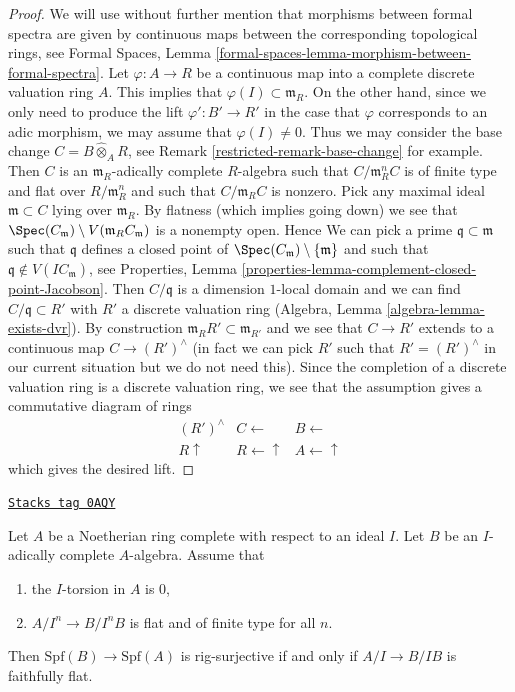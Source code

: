 \begin{proof}

We will use without further mention that morphisms between formal spectra
are given by continuous maps between the corresponding topological rings, see
Formal Spaces, Lemma \ref{formal-spaces-lemma-morphism-between-formal-spectra}.
Let $\varphi : A \to R$ be a continuous map into a complete discrete
valuation ring $A$. This implies that $\varphi(I) \subset \mathfrak m_R$.
On the other hand, since we only need to produce the lift
$\varphi' : B' \to R'$ in the case that $\varphi$ corresponds to an adic
morphism, we may assume that $\varphi(I) \not = 0$. Thus we may consider
the base change $C = B \widehat{\otimes}_A R$, see
Remark \ref{restricted-remark-base-change} for example.
Then $C$ is an $\mathfrak m_R$-adically complete $R$-algebra
such that $C/\mathfrak m_R^n C$ is of finite type and flat over
$R/\mathfrak m_R^n$ and such that $C/\mathfrak m_R C$ is nonzero.
Pick any maximal ideal $\mathfrak m \subset C$ lying over
$\mathfrak m_R$. By flatness (which implies going down) we see that
$\Spec(C_\mathfrak m) \setminus V(\mathfrak m_R C_\mathfrak m)$
is a nonempty open. Hence
We can pick a prime $\mathfrak q \subset \mathfrak m$
such that $\mathfrak q$ defines a closed point of
$\Spec(C_\mathfrak m) \setminus \{\mathfrak m\}$ and such that
$\mathfrak q \not \in V(IC_\mathfrak m)$, see
Properties, Lemma \ref{properties-lemma-complement-closed-point-Jacobson}.
Then $C/\mathfrak q$ is a dimension $1$-local domain and we can find
$C/\mathfrak q \subset R'$ with $R'$ a discrete valuation ring
(Algebra, Lemma \ref{algebra-lemma-exists-dvr}).
By construction $\mathfrak m_R R' \subset \mathfrak m_{R'}$
and we see that $C \to R'$ extends to a continuous map
$C \to (R')^\wedge$ (in fact we can pick $R'$ such that
$R' = (R')^\wedge$ in our current situation but we do not need this).
Since the completion of a discrete valuation ring is a discrete
valuation ring, we see that the assumption gives a commutative
diagram of rings
$$
\begin{array}{ccc}(R')^\wedge & C \longleftarrow & B \longleftarrow \\ R \uparrow & R \longleftarrow\uparrow & A \longleftarrow\uparrow\end{array}
$$
which gives the desired lift.
\end{proof}

\begin{lemma}
\label{restricted-lemma-flat-rig-surjective}
\href{https://stacks.math.columbia.edu/tag/0AQY}{\texttt{Stacks tag 0AQY}}

Let $A$ be a Noetherian ring complete with respect to an ideal $I$.
Let $B$ be an $I$-adically complete $A$-algebra. Assume that
\begin{enumerate}
\item the $I$-torsion in $A$ is $0$,
\item $A/I^n \to B/I^nB$ is flat and of finite type for all $n$.
\end{enumerate}
Then $\text{Spf}(B) \to \text{Spf}(A)$ is rig-surjective if and only
if $A/I \to B/IB$ is faithfully flat.
\end{lemma}

